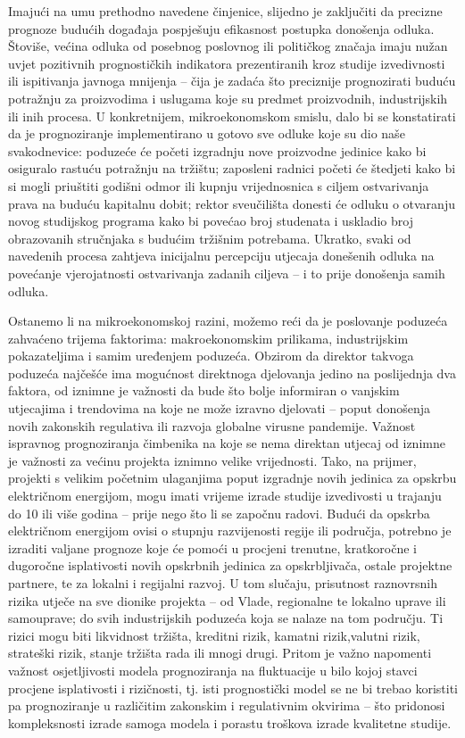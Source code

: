 \documentclass[a4paper,12pt,oneside]{memoir}
\begin{document}
        Imajući na umu prethodno navedene činjenice, slijedno je zaključiti da precizne prognoze budućih događaja pospješuju efikasnost postupka donošenja odluka. Štoviše, većina odluka od posebnog poslovnog ili političkog značaja imaju nužan uvjet pozitivnih prognostičkih indikatora prezentiranih kroz studije izvedivnosti ili ispitivanja javnoga mnijenja -- čija je zadaća što preciznije prognozirati buduću potražnju za proizvodima i uslugama koje su predmet proizvodnih, industrijskih ili inih procesa. U konkretnijem, mikroekonomskom smislu, dalo bi se konstatirati da je prognoziranje implementirano u gotovo sve odluke koje su dio naše svakodnevice: poduzeće će početi izgradnju nove proizvodne jedinice kako bi osiguralo rastuću potražnju na tržištu; zaposleni radnici početi će štedjeti kako bi si mogli priuštiti godišni odmor ili kupnju vrijednosnica s ciljem ostvarivanja prava na buduću kapitalnu dobit; rektor sveučilišta donesti će odluku o otvaranju novog studijskog programa kako bi povećao broj studenata i uskladio broj obrazovanih stručnjaka s budućim tržišnim potrebama. Ukratko, svaki od navedenih procesa zahtjeva inicijalnu percepciju utjecaja donešenih odluka na povećanje vjerojatnosti ostvarivanja zadanih ciljeva -- i to prije donošenja samih odluka.


        Ostanemo li na mikroekonomskoj razini, možemo reći da je poslovanje poduzeća zahvaćeno trijema faktorima: makroekonomskim prilikama, industrijskim pokazateljima i samim uređenjem poduzeća. Obzirom da direktor takvoga poduzeća najčešće ima mogućnost direktnoga djelovanja jedino na poslijednja dva faktora, od iznimne je važnosti da bude što bolje informiran o vanjskim utjecajima i trendovima na koje ne može izravno djelovati -- poput donošenja novih zakonskih regulativa ili razvoja globalne virusne pandemije. Važnost ispravnog prognoziranja čimbenika na koje se nema direktan utjecaj od iznimne je važnosti za većinu projekta iznimno velike vrijednosti. Tako, na prijmer, projekti s velikim početnim ulaganjima poput izgradnje novih jedinica za opskrbu električnom energijom, mogu imati vrijeme izrade studije izvedivosti u trajanju do 10 ili više godina -- prije nego što li se započnu radovi. Budući da opskrba električnom energijom ovisi o stupnju razvijenosti regije ili područja, potrebno je izraditi valjane prognoze koje će pomoći u procjeni trenutne, kratkoročne i dugoročne isplativosti novih opskrbnih jedinica za opskrbljivača, ostale projektne partnere, te za lokalni i regijalni razvoj. U tom slučaju, prisutnost raznovrsnih rizika utječe na sve dionike projekta -- od Vlade, regionalne te lokalno uprave ili samouprave; do svih industrijskih poduzeća koja se nalaze na tom području. Ti rizici mogu biti likvidnost tržišta, kreditni rizik, kamatni rizik,valutni rizik, strateški rizik, stanje tržišta rada ili mnogi drugi. Pritom je važno napomenti važnost osjetljivosti modela prognoziranja na fluktuacije u bilo kojoj stavci procjene isplativosti i rizičnosti, tj. isti prognostički model se ne bi trebao koristiti pa prognoziranje u različitim zakonskim i regulativnim okvirima -- što pridonosi kompleksnosti izrade samoga modela i porastu troškova izrade kvalitetne studije.
\end{document}
